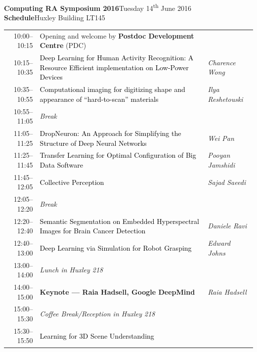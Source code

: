 \documentclass[11pt]{article}
\newcommand{\schetalk}[1]{\noindent\textcolor{black}{#1}}
\newcommand{\schespeaker}[1]{\textit{#1}}
\begin{document}
\textbf{\flushleft\Huge Computing RA Symposium 2016}\hfill{}Tuesday 14\textsuperscript{th} June 2016\\
\textbf{\flushleft\LARGE\color{icdarkblue}Schedule}\hfill{}Huxley Building LT145\\[0.5cm]

\renewcommand{\arraystretch}{1.2}
\begin{tabular}{r@{\quad\color{icdarkblue}{\vline}\quad}p{10cm}@{\quad\color{iclightblue}{\vline}\quad}l}
  10:00--10:15
  & Opening and welcome by \textbf{Postdoc Development Centre} (PDC)
  & \\
  10:15--10:35
  & \schetalk{Deep Learning for Human Activity Recognition: A Resource Efficient implementation on Low-Power Devices}
  & \schespeaker{Charence Wong}
  \\
  10:35--10:55
  & \schetalk{Computational imaging for digitizing shape and appearance of ``hard-to-scan'' materials}
  & \schespeaker{Ilya Reshetouski}
  \\[0.8cm]
  \textcolor{nontalk}{10:55--11:05}
  & \textit{\color{nontalk}Break}
  & \\[0.3cm]
  11:05--11:25
  & \schetalk{DropNeuron: An Approach for Simplifying the Structure of Deep Neural Networks}
  & \schespeaker{Wei Pan}\\
  11:25--11:45
  & \schetalk{Transfer Learning for Optimal Configuration of Big Data Software}
  & \schespeaker{Pooyan Jamshidi}\\
  11:45--12:05
  & \schetalk{Collective Perception}
  & \schespeaker{Sajad Saeedi}\\[0.3cm]
  \textcolor{nontalk}{12:05--12:20}
  & \textit{\color{nontalk}Break}
  & \\[0.3cm]
  12:20--12:40
  & \schetalk{Semantic Segmentation on Embedded Hyperspectral Images for Brain Cancer Detection}
  & \schespeaker{Daniele Ravi}\\
  12:40--13:00
  & \schetalk{Deep Learning via Simulation for Robot Grasping}
  & \schespeaker{Edward Johns}\\[0.3cm]
  \textcolor{nontalk}{13:00--14:00}
  & \textit{\color{nontalk}Lunch in Huxley 218}
  & \\[0.3cm]
  14:00--15:00
  & {\large\bf Keynote --- Raia Hadsell, Google DeepMind}
  & \textit{Raia Hadsell}\\
  \textcolor{nontalk}{15:00--15:30}
  & \textit{\color{nontalk}Coffee Break/Reception in Huxley 218}
  & \\[0.3cm]
  15:30--15:50
  & \schetalk{Learning for 3D Scene Understanding}

\end{tabular}
\end{document}
